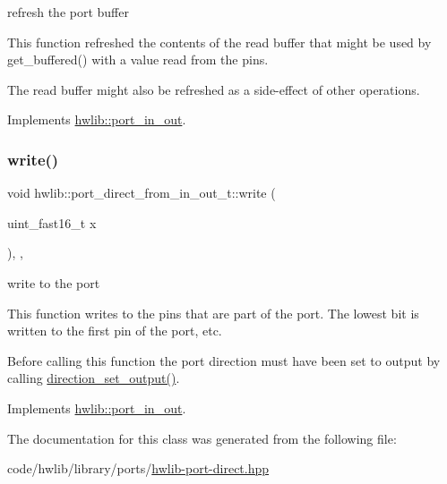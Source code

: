 refresh the port buffer

This function refreshed the contents of the read buffer that might be used by get\+\_\+buffered() with a value read from the pins.

The read buffer might also be refreshed as a side-\/effect of other operations. 

Implements \hyperlink{classhwlib_1_1port__in__out_afa3680e36a05dd3f5a0eac1b63aac37c}{hwlib\+::port\+\_\+in\+\_\+out}.

\mbox{\label{classhwlib_1_1port__direct__from__in__out__t_a952b994b4b4793590252781686468e48}} 
\subsubsection{\texorpdfstring{write()}{write()}}
{\footnotesize\ttfamily void hwlib\+::port\+\_\+direct\+\_\+from\+\_\+in\+\_\+out\+\_\+t\+::write (\begin{DoxyParamCaption}\item[{uint\+\_\+fast16\+\_\+t}]{x }\end{DoxyParamCaption})\hspace{0.3cm}{\ttfamily [inline]}, {\ttfamily [override]}, {\ttfamily [virtual]}}

write to the port

This function writes to the pins that are part of the port. The lowest bit is written to the first pin of the port, etc.

Before calling this function the port direction must have been set to output by calling \hyperlink{classhwlib_1_1port__direct__from__in__out__t_a8702543e5a779026dd0b8602aaf5ae56}{direction\+\_\+set\+\_\+output()}. 

Implements \hyperlink{classhwlib_1_1port__in__out_a0019c1f35d6f7b1d3ace6b22da86ecec}{hwlib\+::port\+\_\+in\+\_\+out}.



The documentation for this class was generated from the following file\+:\begin{DoxyCompactItemize}
\item 
code/hwlib/library/ports/\hyperlink{hwlib-port-direct_8hpp}{hwlib-\/port-\/direct.\+hpp}\end{DoxyCompactItemize}
